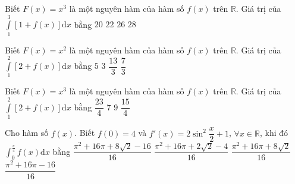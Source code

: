 \begin{ex}%
	Biết $F(x) = x^3$ là một nguyên hàm của hàm số $f(x)$ trên $\mathbb{R}$. Giá trị của $\displaystyle\int\limits_{1}^{3} \left[ 1 + f(x) \right] \mathrm{d}x$ bằng
	\choice
	{$20$}
	{$22$}
	{$26$}
	{\True $28$}

\end{ex}
\begin{ex}%
	Biết $F(x) = x^2$ là một nguyên hàm của hàm số $f(x)$ trên $\mathbb{R}$. Giá trị của $\displaystyle\int\limits_{1}^{2} \left[ 2 + f(x) \right] \mathrm{d}x$ bằng
	\choice
	{\True$5$}
	{$3$}
	{$\dfrac{13}{3}$}
	{$\dfrac{7}{3}$}
\end{ex}
\begin{ex}%
	Biết $F(x) = x^3$ là một nguyên hàm của hàm số $f(x)$ trên $\mathbb{R}$. Giá trị của $\displaystyle\int\limits_{1}^{2} \left[ 2 + f(x) \right] \mathrm{d}x$ bằng
	\choice
	{$\dfrac{23}{4}$}
	{$7$}
	{\True$9$}
	{$\dfrac{15}{4}$}
\end{ex}
\begin{ex}%
	Cho hàm số $f(x)$. Biết $f(0) = 4$ và $f'(x) = 2 \sin^2 \dfrac{x}{2} + 1$, $\forall x \in \mathbb{R}$, khi đó $\displaystyle\int_{0}^{\frac{\pi}{4}} f(x) \mathrm{d}x$ bằng
	\choice
	{\True $\dfrac{\pi^2 + 16\pi + 8\sqrt{2} - 16}{16}$}
	{$\dfrac{\pi^2 + 16\pi + 2\sqrt{2} - 4}{16}$}
	{$\dfrac{\pi^2 + 16\pi + 8\sqrt{2}}{16}$}
	{$\dfrac{\pi^2 + 16\pi - 16}{16}$}
\end{ex}
